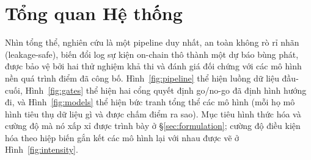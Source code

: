 \documentclass[11pt,a4paper]{article}
\begin{document}
\section{Tổng quan Hệ thống}
\label{sec:system}

Nhìn tổng thể, nghiên cứu là một pipeline duy nhất, an toàn không rò rỉ nhãn (leakage-safe), biến đổi log sự kiện on-chain thô thành một dự báo bùng phát, được bảo vệ bởi hai thử nghiệm khả thi và đánh giá đối chứng với các mô hình nền quá trình điểm đã công bố. Hình~\ref{fig:pipeline} thể hiện luồng dữ liệu đầu-cuối, Hình~\ref{fig:gates} thể hiện hai cổng quyết định go/no-go đã định hình hướng đi, và Hình~\ref{fig:models} thể hiện bức tranh tổng thể các mô hình (mỗi họ mô hình tiêu thụ dữ liệu gì và được chấm điểm ra sao). Mục tiêu hình thức hóa và cường độ mà nó xấp xỉ được trình bày ở \S\ref{sec:formulation}; cường độ điều kiện hóa theo hiệp biến gắn kết các mô hình lại với nhau được vẽ ở Hình~\ref{fig:intensity}.
\end{document}

